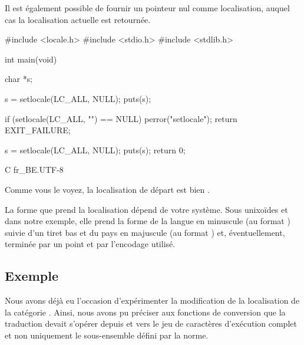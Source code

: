 
Il est également possible de fournir un pointeur nul comme localisation,
auquel cas la localisation actuelle est retournée.

\begin{C}
#include <locale.h>
#include <stdio.h>
#include <stdlib.h>


int main(void)
{
    char *s;

    s = setlocale(LC_ALL, NULL);
    puts(s);

    if (setlocale(LC_ALL, "") == NULL)
    {
        perror("setlocale");
        return EXIT_FAILURE;
    }

    s = setlocale(LC_ALL, NULL);
    puts(s);
    return 0;
}
\end{C}

\begin{C}
C
fr_BE.UTF-8
\end{C}

Comme vous le voyez, la localisation de départ est bien .

\begin{infobox}
  La forme que prend la localisation
dépend de votre système. Sous unixoïdes et dans notre exemple, elle
prend la forme de la langue en minuscule (au format
) suivie d'un tiret
bas et du pays en majuscule (au format
) et,
éventuellement, terminée par un point et par l'encodage utilisé.
\end{infobox}


\subsection{Exemple}
\label{exemple-15}

Nous avons déjà eu l'occasion d'expérimenter la modification de la
localisation de la catégorie . Ainsi, nous avons pu
préciser aux fonctions de conversion que la traduction devait s'opérer
depuis et vers le jeu de caractères d'exécution complet et non
uniquement le sous-ensemble défini par la norme.

